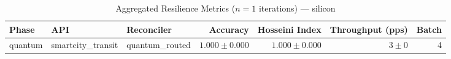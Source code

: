 
\begin{table}[htbp]
\caption{Aggregated Resilience Metrics ($n=1$ iterations) --- silicon}
\begin{tabular}{l l l r r r r}
\hline
Phase & API & Reconciler & Accuracy & Hosseini Index & Throughput (pps) & Batch \\
\hline
quantum & smartcity\_transit & quantum\_routed & $1.000\pm0.000$ & $1.000\pm0.000$ & $3\pm0$ & 4 \\
\hline
\end{tabular}
\end{table}
